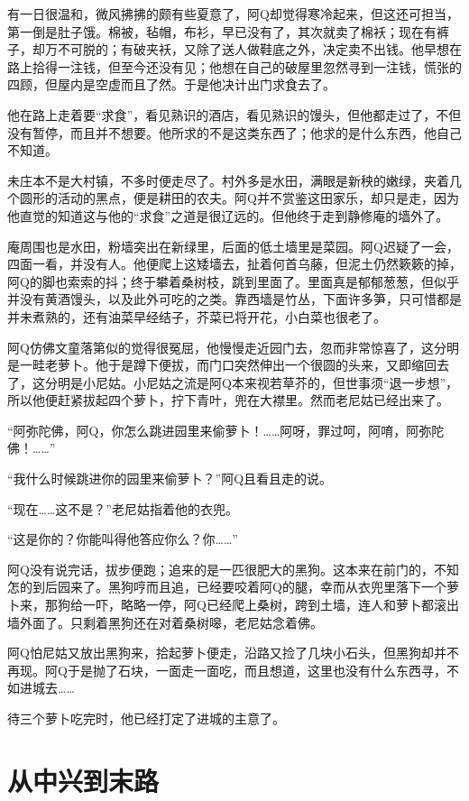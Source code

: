 \documentclass[12pt,UTF8]{ctexbook}
\begin{document}
有一日很温和，微风拂拂的颇有些夏意了，阿Q却觉得寒冷起来，但这还可担当，第一倒是肚子饿。棉被，毡帽，布衫，早已没有了，其次就卖了棉袄；现在有裤子，却万不可脱的；有破夹袄，又除了送人做鞋底之外，决定卖不出钱。他早想在路上拾得一注钱，但至今还没有见；他想在自己的破屋里忽然寻到一注钱，慌张的四顾，但屋内是空虚而且了然。于是他决计出门求食去了。

他在路上走着要“求食”，看见熟识的酒店，看见熟识的馒头，但他都走过了，不但没有暂停，而且并不想要。他所求的不是这类东西了；他求的是什么东西，他自己不知道。

未庄本不是大村镇，不多时便走尽了。村外多是水田，满眼是新秧的嫩绿，夹着几个圆形的活动的黑点，便是耕田的农夫。阿Q并不赏鉴这田家乐，却只是走，因为他直觉的知道这与他的“求食”之道是很辽远的。但他终于走到静修庵的墙外了。

庵周围也是水田，粉墙突出在新绿里，后面的低土墙里是菜园。阿Q迟疑了一会，四面一看，并没有人。他便爬上这矮墙去，扯着何首乌藤，但泥土仍然簌簌的掉，阿Q的脚也索索的抖；终于攀着桑树枝，跳到里面了。里面真是郁郁葱葱，但似乎并没有黄酒馒头，以及此外可吃的之类。靠西墙是竹丛，下面许多笋，只可惜都是并未煮熟的，还有油菜早经结子，芥菜已将开花，小白菜也很老了。

阿Q仿佛文童落第似的觉得很冤屈，他慢慢走近园门去，忽而非常惊喜了，这分明是一畦老萝卜。他于是蹲下便拔，而门口突然伸出一个很圆的头来，又即缩回去了，这分明是小尼姑。小尼姑之流是阿Q本来视若草芥的，但世事须“退一步想”，所以他便赶紧拔起四个萝卜，拧下青叶，兜在大襟里。然而老尼姑已经出来了。

“阿弥陀佛，阿Q，你怎么跳进园里来偷萝卜！……阿呀，罪过呵，阿唷，阿弥陀佛！……”

“我什么时候跳进你的园里来偷萝卜？”阿Q且看且走的说。

“现在……这不是？”老尼姑指着他的衣兜。

“这是你的？你能叫得他答应你么？你……”

阿Q没有说完话，拔步便跑；追来的是一匹很肥大的黑狗。这本来在前门的，不知怎的到后园来了。黑狗哼而且追，已经要咬着阿Q的腿，幸而从衣兜里落下一个萝卜来，那狗给一吓，略略一停，阿Q已经爬上桑树，跨到土墙，连人和萝卜都滚出墙外面了。只剩着黑狗还在对着桑树嗥，老尼姑念着佛。

阿Q怕尼姑又放出黑狗来，拾起萝卜便走，沿路又捡了几块小石头，但黑狗却并不再现。阿Q于是抛了石块，一面走一面吃，而且想道，这里也没有什么东西寻，不如进城去……

待三个萝卜吃完时，他已经打定了进城的主意了。

\chapter{从中兴到末路}
\end{document}
